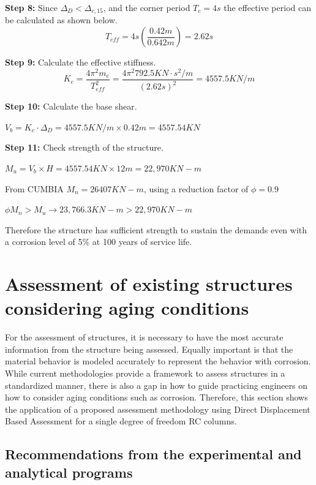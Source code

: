 \textbf{Step 8:} Since $\Delta_{D}<\Delta_{c,15}$, and the corner period $T_{c}=4s$ the effective period can be calculated as shown below.
\begin{displaymath}
    T_{eff}=4s \left(\frac{0.42m}{0.642m}\right)=2.62s
\end{displaymath}

\textbf{Step 9:} Calculate the effective stiffness.
\begin{displaymath}
    K_{e}=\frac{4\pi^2m_{e}}{T_{eff}^2}=\frac{4\pi^2 792.5 KN\cdot s^2/m}{(2.62s)^2}=4557.5 KN/m
\end{displaymath}

\textbf{Step 10:} Calculate the base shear.

$\displaystyle V_{b}=K_{e} \cdot \Delta_{D}= 4557.5 KN/m \times 0.42m = 4557.54 KN$

\textbf{Step 11:} Check strength of the structure.

$M_{u}=V_{b} \times H=4557.54 KN \times 12m = 22,970 KN-m$

From CUMBIA $M_{n} = 26407 KN-m$, using a reduction factor of $\phi=0.9$

$\phi M_{n}>M_{u} \to 23,766.3 KN-m > 22,970 KN-m$

Therefore the structure has sufficient strength to sustain the demands even with a corrosion level of 5\% at 100 years of service life.

\section{Assessment of existing structures considering aging conditions}

For the assessment of structures, it is necessary to have the most accurate information from the structure being assessed. Equally important is that the material behavior is modeled accurately to represent the behavior with corrosion. While current methodologies provide a framework to assess structures in a standardized manner, there is also a gap in how to guide practicing engineers on how to consider aging conditions such as corrosion. Therefore, this section shows the application of a proposed assessment methodology using Direct Displacement Based Assessment for a single degree of freedom RC columns. 

\subsection{Recommendations from the experimental and analytical programs}

